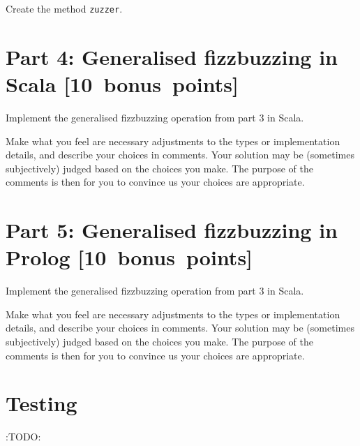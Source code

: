 \documentclass[11pt]{article}
\begin{document}
Create the method \texttt{zuzzer}.

\section*{Part 4: Generalised fizzbuzzing in Scala                [10 bonus points]}
\label{sec:org239204e}
Implement the generalised fizzbuzzing operation from part 3 in Scala.

Make what you feel are necessary adjustments to the types or
implementation details, and describe your choices in comments.
Your solution may be (sometimes subjectively) judged based on
the choices you make. The purpose of the comments is then
for you to convince us your choices are appropriate.

\section*{Part 5: Generalised fizzbuzzing in Prolog               [10 bonus points]}
\label{sec:org4a8fc7b}
Implement the generalised fizzbuzzing operation from part 3 in Scala.

Make what you feel are necessary adjustments to the types or
implementation details, and describe your choices in comments.
Your solution may be (sometimes subjectively) judged based on
the choices you make. The purpose of the comments is then
for you to convince us your choices are appropriate.

\section*{Testing}
\label{sec:org06d8b3b}
:TODO:
\end{document}
